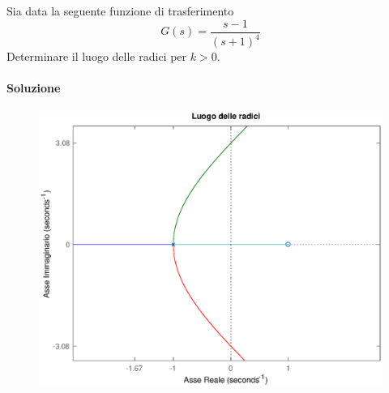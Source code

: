 \begin{esercizio}
Sia data la seguente funzione di trasferimento
\[
	G(s) = \frac{s-1}{(s+1)^4}
\]
Determinare il luogo delle radici per \(k>0\).

\paragraph{Soluzione}

\begin{figure}[ht]
	\centering
	\includegraphics[scale=.6]{mod1/assets/rl_ex314}
\end{figure}


\end{esercizio}
